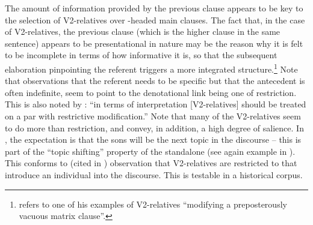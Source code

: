 \documentclass[output=paper,colorlinks,citecolor=brown]{langscibook}
\begin{document}
The amount of information provided by the previous clause appears to be key to the selection of V2-relatives over -headed main clauses.
The fact that, in the case of V2-relatives, the previous clause (which is the higher clause in the same sentence) appears to be presentational in nature may be the reason why it is felt to be incomplete in terms of how informative it is, so that the subsequent elaboration pinpointing the referent triggers a more integrated structure.\footnote{\citet[113]{Gärtner2001} refers to one of his examples of V2-relatives “modifying a preposterously vacuous matrix clause”.} Note that observations that the referent needs to be specific but that the antecedent is often indefinite, seem to point to the denotational link being one of restriction. This is also noted by \citet[113]{Gärtner2001}: “in terms of interpretation [V2-relatives] should be treated on a par with restrictive modification.” Note that many of the V2-relatives seem to do more than restriction, and convey, in addition, a high degree of salience. In , the expectation is that the sons will be the next topic in the discourse – this is part of the “topic shifting” property of the standalone  (see again example  in ). This conforms to  (cited in \citealt[131]{Gärtner2001}) observation that V2-relatives are restricted to  that introduce an individual into the discourse. This is testable in a historical corpus.
\end{document}
